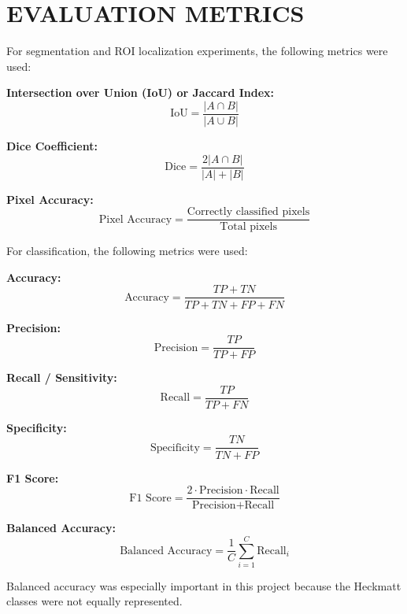 \chapter{EVALUATION METRICS}
\label{metrics}
For segmentation and ROI localization experiments, the following metrics were used:

\textbf{Intersection over Union (IoU) or Jaccard Index:}
\[
\text{IoU} = \frac{|A \cap B|}{|A \cup B|}
\]

\textbf{Dice Coefficient:}
\[
\text{Dice} = \frac{2|A \cap B|}{|A| + |B|}
\]

\textbf{Pixel Accuracy:}
\[
\text{Pixel Accuracy} = \frac{\text{Correctly classified pixels}}{\text{Total pixels}}
\]

For classification, the following metrics were used:

\textbf{Accuracy:}
\[
\text{Accuracy} = \frac{TP + TN}{TP + TN + FP + FN}
\]

\textbf{Precision:}
\[
\text{Precision} = \frac{TP}{TP + FP}
\]

\textbf{Recall / Sensitivity:}
\[
\text{Recall} = \frac{TP}{TP + FN}
\]

\textbf{Specificity:}
\[
\text{Specificity} = \frac{TN}{TN + FP}
\]

\textbf{F1 Score:}
\[
\text{F1 Score} = \frac{2 \cdot \text{Precision} \cdot \text{Recall}}{\text{Precision} + \text{Recall}}
\]

\textbf{Balanced Accuracy:}
\[
\text{Balanced Accuracy} = \frac{1}{C}\sum_{i=1}^{C}\text{Recall}_{i}
\]

Balanced accuracy was especially important in this project because the Heckmatt classes were not equally represented.